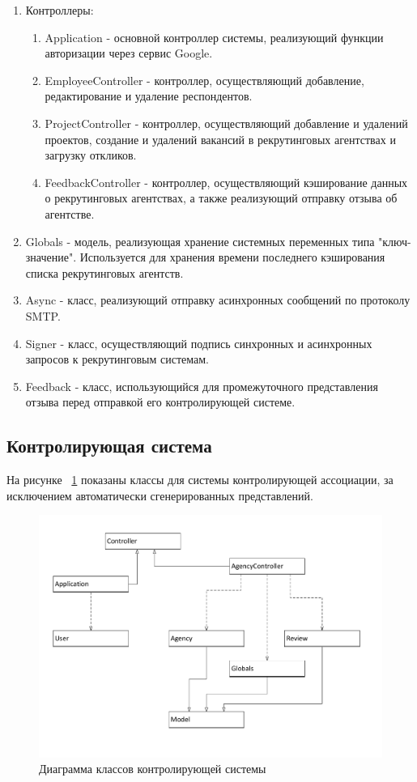 {\begin{enumerate}
\item Контроллеры:
\begin{enumerate}
\item Application - основной контроллер системы, реализующий функции авторизации через сервис Google.
\item EmployeeController - контроллер, осуществляющий добавление, редактирование и удаление респондентов.
\item ProjectController - контроллер, осуществляющий добавление и удалений проектов, создание и удалений вакансий в рекрутинговых агентствах и загрузку откликов.
\item FeedbackController - контроллер, осуществляющий кэширование данных о рекрутинговых агентствах, а также реализующий отправку отзыва об агентстве.
\end{enumerate}
\item Globals - модель, реализующая хранение системных переменных типа "ключ-значение". Используется для хранения времени последнего кэширования списка рекрутинговых агентств.
\item Async - класс, реализующий отправку асинхронных сообщений по протоколу SMTP.
\item Signer - класс, осуществляющий подпись синхронных и асинхронных запросов к рекрутинговым системам.
\item Feedback - класс, использующийся для промежуточного представления отзыва перед отправкой его контролирующей системе.
\end{enumerate}

\subsection{Контролирующая система}
На рисунке ~\ref{fig:class-supervising} показаны классы для системы контролирующей ассоциации, за исключением автоматически сгенерированных представлений.
\begin{figure}[ht]
  \centering
  \includegraphics[width=\textwidth]{include/class-supervising.pdf}
  \caption{Диаграмма классов контролирующей системы}
  \label{fig:class-supervising}
\end{figure}

}

